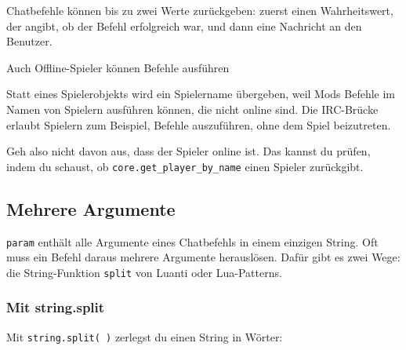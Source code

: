 Chatbefehle können bis zu zwei Werte zurückgeben: zuerst einen
Wahrheitswert, der angibt, ob der Befehl erfolgreich war, und dann eine
Nachricht an den Benutzer.

\begin{hinweis}{Auch Offline-Spieler können Befehle ausführen}

Statt eines Spielerobjekts wird ein Spielername übergeben, weil Mods
Befehle im Namen von Spielern ausführen können, die nicht online sind.
Die IRC-Brücke erlaubt Spielern zum Beispiel, Befehle auszuführen, ohne
dem Spiel beizutreten.

Geh also nicht davon aus, dass der Spieler online ist. Das kannst du
prüfen, indem du schaust, ob
\texttt{core.\allowbreak{}get\_\allowbreak{}player\_\allowbreak{}by\_\allowbreak{}name}
einen Spieler zurückgibt.

\end{hinweis}

\subsection{Mehrere Argumente}\label{mehrere-argumente}

\texttt{param} enthält alle Argumente eines Chatbefehls in einem
einzigen String. Oft muss ein Befehl daraus mehrere Argumente
herauslösen. Dafür gibt es zwei Wege: die String-Funktion \texttt{split}
von Luanti oder Lua-Patterns.

\subsubsection{Mit string.split}\label{mit-string.split}

Mit \texttt{string.\allowbreak{}split(\textquotedbl{} \textquotedbl{})}
zerlegst du einen String in Wörter:

